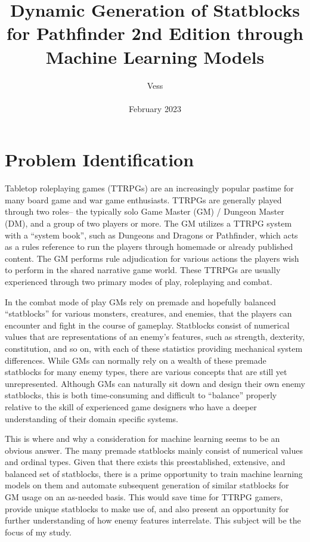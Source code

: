 \documentclass[11pt]{article}
\begin{document}
\title{Dynamic Generation of Statblocks for Pathfinder 2nd Edition through Machine Learning Models}

\author{Vess\\ \\February 2023}
\date{}

\maketitle

\section{Problem Identification}

Tabletop roleplaying games (TTRPGs) are an increasingly popular pastime for many board game and war game enthusiasts. TTRPGs are generally played through two roles-- the typically solo Game Master (GM) / Dungeon Master (DM), and a group of two players or more. The GM utilizes a TTRPG system with a ``system book'', such as Dungeons and Dragons or Pathfinder, which acts as a rules reference to run the players through homemade or already published content. The GM performs rule adjudication for various actions the players wish to perform in the shared narrative game world. These TTRPGs are usually experienced through two primary modes of play, roleplaying and combat.

In the combat mode of play GMs rely on premade and hopefully balanced ``statblocks'' for various monsters, creatures, and enemies, that the players can encounter and fight in the course of gameplay. Statblocks consist of numerical values that are representations of an enemy's features, such as strength, dexterity, constitution, and so on, with each of these statistics providing mechanical system differences. While GMs can normally rely on a wealth of these premade statblocks for many enemy types, there are various concepts that are still yet unrepresented. Although GMs can naturally sit down and design their own enemy statblocks, this is both time-consuming and difficult to ``balance'' properly relative to the skill of experienced game designers who have a deeper understanding of their domain specific systems.

This is where and why a consideration for machine learning seems to be an obvious answer. The many premade statblocks mainly consist of numerical values and ordinal types. Given that there exists this preestablished, extensive, and balanced set of statblocks, there is a prime opportunity to train machine learning models on them and automate subsequent generation of similar statblocks for GM usage on an as-needed basis. This would save time for TTRPG gamers, provide unique statblocks to make use of, and also present an opportunity for further understanding of how enemy features interrelate. This subject will be the focus of my study.
\end{document}
